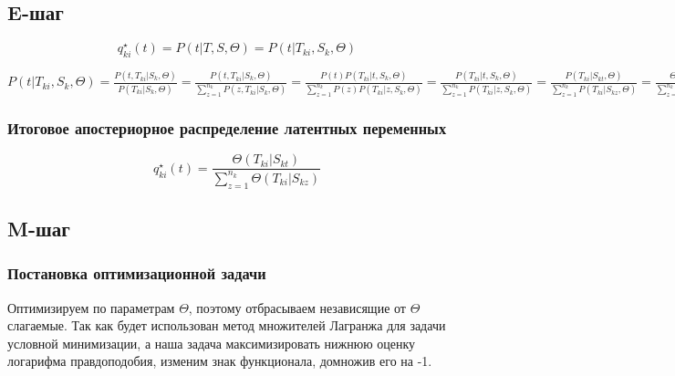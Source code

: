 \documentclass[10pt]{article}
\begin{document}
	\subsection*{E-шаг}
	
	{
	
	
	$$ q_{ki}^{\star}(t) = P(t | T, S, \Theta) = P(t | T_{ki}, S_k, \Theta) $$
	
	\large
	
	$ P(t | T_{ki}, S_k, \Theta)
	= \frac{P(t, T_{ki} | S_k, \Theta)}{P(T_{ki} | S_k, \Theta)}
	= \frac{P(t, T_{ki} | S_k, \Theta)}{\sum_{z=1}^{n_k} P(z, T_{ki} | S_k, \Theta)}
	= \frac{P(t) P(T_{ki} | t, S_k, \Theta)}{\sum_{z=1}^{n_k} P(z) P(T_{ki} | z, S_k, \Theta)}
	= \frac{P(T_{ki} | t, S_k, \Theta)}{\sum_{z=1}^{n_k} P(T_{ki} | z, S_k, \Theta)}
	= \frac{P(T_{ki} | S_{kt}, \Theta)}{\sum_{z=1}^{n_k} P(T_{ki} | S_{kz}, \Theta)}
	= \frac{\Theta (T_{ki} | S_{kt})}{\sum_{z=1}^{n_k} \Theta(T_{ki} | S_{kz})}
	$
	
    }
	
	\subsubsection*{Итоговое апостериорное распределение латентных переменных}
	
	
	
	$$ q_{ki}^{\star}(t) = \frac{\Theta (T_{ki} | S_{kt})}{\sum_{z=1}^{n_k} \Theta(T_{ki} | S_{kz})}
	$$
	
	
	
	\subsection*{M-шаг}
	
	\subsubsection*{Постановка оптимизационной задачи}
	
	Оптимизируем по параметрам $\Theta$, поэтому отбрасываем независящие от $\Theta$ слагаемые.  
	Так как будет использован метод множителей Лагранжа для задачи условной минимизации, а наша задача максимизировать нижнюю оценку логарифма правдоподобия, изменим знак функционала, домножив его на -1. 
	
\end{document}
